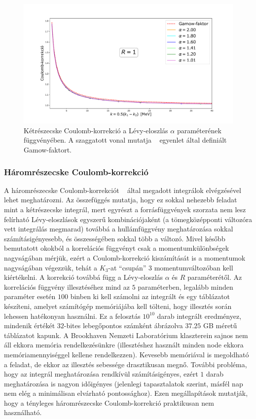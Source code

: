 \documentclass[11pt,a4paper]{article}
\numberwithin{equation}{subsection}
\numberwithin{figure}{section}
\begin{document}
\begin{figure}[H]
\centering
\includegraphics[scale=0.45]{pic/Coulomb/C2_dalpha_R1_S2correct.pdf}
\caption{Kétrészecske Coulomb-korrekció a Lévy-eloszlás $\alpha$ paraméterének függvényében. A szaggatott vonal mutatja ~ egyenlet által definiált Gamow-faktort.}
\label{fig:CRK2dalpha}
\end{figure}

\subsubsection{Háromrészecske Coulomb-korrekció}

A háromrészecske Coulomb-korrekciót ~ által megadott integrálok elvégzésével lehet meghatározni. Az összefüggés mutatja, hogy ez sokkal nehezebb feladat mint a kétrészecske integrál, mert egyrészt a forrásfüggvények szorzata nem lesz felírható Lévy-eloszlások egyszerű kombinációjaként (a tömegközépponti változóra vett integrálás megmarad) továbbá a hullámfüggvény meghatározása sokkal számításigényesebb, és összességében sokkal több a változó. Mivel később bemutatott okokból a korrelációs függvényt csak a momentumkülönbségek nagyságában mérjük, ezért a Coulomb-korrekció kiszámítását is a momentumok nagyságában végezzük, tehát a $K_3$-at ``csupán'' $3$ momentumváltozóban kell kiértékelni. A korrekció továbbá függ a Lévy-eloszlás $\alpha$ és $R$ paraméterétől. Az korrelációs függvény illesztéséhez mind az $5$ paraméterben, legalább minden paraméter esetén $100$ binben ki kell számolni az integrált és egy táblázatot készíteni, amelyet számítógép memóriájába kell tölteni, hogy illesztés során lehessen hatékonyan használni. Ez a felosztás $10^{10}$ darab integrált eredményez, mindenik értékét $32$-bites lebegőpontos számként ábrázolva $37.25$ GB méretű táblázatot kapunk. A Brookhaven Nemzeti Laboratórium klaszterein sajnos nem áll ekkora memória rendelkezésünkre (illesztéshez használt minden node ekkora memóriamennyiséggel kellene rendelkezzen). Kevesebb memóriával is megoldható a feladat, de ekkor az illesztés sebessége drasztikusan megnő. További probléma, hogy az integrál meghatározása rendkívül számításigényes, ezért $1$ darab meghatározása is nagyon időigényes (jelenlegi tapasztalatok szerint, másfél nap nem elég a minimálisan elvárható pontossághoz). Ezen megállapítások mutatják, hogy a tényleges háromrészecske Coulomb-korrekció praktikusan nem használható.
\end{document}
